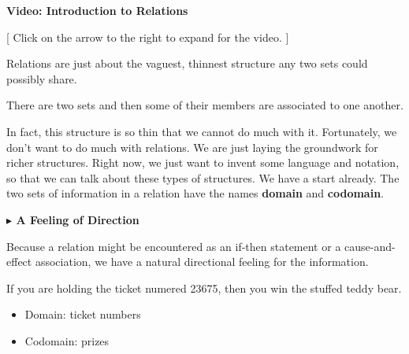 \documentclass{ximera}
\begin{document}
\begin{explanation} \textbf{Video: Introduction to Relations}

[ Click on the arrow to the right to expand for the video. ]
\begin{expandable} 

\begin{center}
\end{center}

\end{expandable}
\end{explanation}





Relations are just about the vaguest, thinnest structure any two sets could possibly share. \\


\begin{center}
There are two sets and then some of their members are associated to one another. 
\end{center}


In fact, this structure is so thin that we cannot do much with it.  Fortunately, we don't want to do much with relations.  We are just laying the groundwork for richer structures.  Right now, we just want to invent some language and notation, so that we can talk about these types of structures. We have a start already. The two sets of information in a relation have the names \textbf{\textcolor{purple!85!blue}{domain}} and \textbf{\textcolor{purple!85!blue}{codomain}}.




\textbf{\textcolor{red!80!black}{$\blacktriangleright$ A Feeling of Direction}}



Because a relation might be encountered as an if-then statement or a cause-and-effect association, we have a natural directional feeling for the information.  



\begin{idea}
If you are holding the ticket numered 23675, then you win the stuffed teddy bear. \\

\begin{itemize}
    \item Domain: ticket numbers
    \item Codomain: prizes
\end{itemize}

\end{idea}
\end{document}
